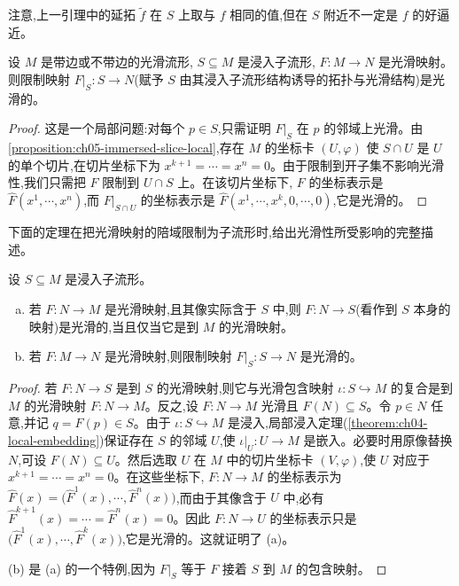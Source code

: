 \documentclass[../../main.tex]{subfiles}
\begin{document}
注意,上一引理中的延拓 $\widetilde{f}$ 在 $S$ 上取与 $f$ 相同的值,但在 $S$ 附近不一定是 $f$ 的好逼近。

\begin{theorem}\label{theorem:ch05-restrict-domain}
设 $M$ 是带边或不带边的光滑流形, $S\subseteq M$ 是浸入子流形, $F:M\to N$ 是光滑映射。则限制映射 $F|_S:S\to N$(赋予 $S$ 由其浸入子流形结构诱导的拓扑与光滑结构)是光滑的。
\end{theorem}

\begin{proof}
这是一个局部问题:对每个 $p\in S$,只需证明 $F|_S$ 在 $p$ 的邻域上光滑。由\cref{proposition:ch05-immersed-slice-local},存在 $M$ 的坐标卡 $(U,\varphi)$ 使 $S\cap U$ 是 $U$ 的单个切片,在切片坐标下为 $x^{k+1}=\cdots=x^n=0$。由于限制到开子集不影响光滑性,我们只需把 $F$ 限制到 $U\cap S$ 上。在该切片坐标下, $F$ 的坐标表示是 $\widehat{F}(x^1,\cdots ,x^n)$,而 $F|_{S\cap U}$ 的坐标表示是 $\widehat{F}(x^1,\cdots ,x^k,0,\cdots ,0)$,它是光滑的。
\end{proof}

下面的定理在把光滑映射的陪域限制为子流形时,给出光滑性所受影响的完整描述。

\begin{theorem}\label{theorem:ch05-restrict-codomain}
设 $S\subseteq M$ 是浸入子流形。
\begin{enumerate}[(a)]
\item 若 $F:N\to M$ 是光滑映射,且其像实际含于 $S$ 中,则 $F:N\to S$(看作到 $S$ 本身的映射)是光滑的,当且仅当它是到 $M$ 的光滑映射。
\item 若 $F:M\to N$ 是光滑映射,则限制映射 $F|_S:S\to N$ 是光滑的。
\end{enumerate}
\end{theorem}

\begin{proof}
若 $F:N\to S$ 是到 $S$ 的光滑映射,则它与光滑包含映射 $\iota:S\hookrightarrow M$ 的复合是到 $M$ 的光滑映射 $F:N\to M$。反之,设 $F:N\to M$ 光滑且 $F(N)\subseteq S$。令 $p\in N$ 任意,并记 $q=F(p)\in S$。由于 $\iota:S\hookrightarrow M$ 是浸入,局部浸入定理(\cref{theorem:ch04-local-embedding})保证存在 $S$ 的邻域 $U$,使 $\iota|_U:U\to M$ 是嵌入。必要时用原像替换 $N$,可设 $F(N)\subseteq U$。然后选取 $U$ 在 $M$ 中的切片坐标卡 $(V,\varphi)$,使 $U$ 对应于 $x^{k+1}=\cdots=x^n=0$。在这些坐标下, $F:N\to M$ 的坐标表示为 $\widehat{F}(x)=\bigl(\widehat{F}^1(x),\cdots ,\widehat{F}^n(x)\bigr)$,而由于其像含于 $U$ 中,必有 $\widehat{F}^{k+1}(x)=\cdots=\widehat{F}^n(x)=0$。因此 $F:N\to U$ 的坐标表示只是 $\bigl(\widehat{F}^1(x),\cdots ,\widehat{F}^k(x)\bigr)$,它是光滑的。这就证明了 (a)。

(b) 是 (a) 的一个特例,因为 $F|_S$ 等于 $F$ 接着 $S$ 到 $M$ 的包含映射。
\end{proof}
\end{document}
